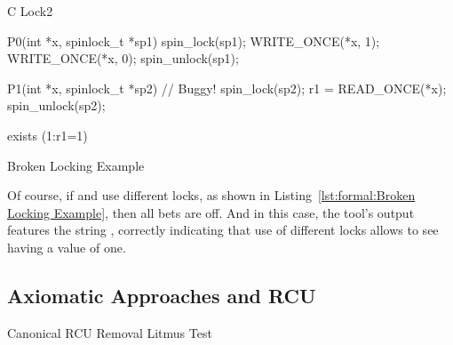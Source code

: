 \begin{listing}[tb]
\begin{linelabel}
\begin{VerbatimL}[commandchars=\\\[\]]
C Lock2

{
}

P0(int *x, spinlock_t *sp1)
{
	spin_lock(sp1);
	WRITE_ONCE(*x, 1);
	WRITE_ONCE(*x, 0);
	spin_unlock(sp1);
}

P1(int *x, spinlock_t *sp2) // Buggy!
{
	spin_lock(sp2);
	r1 = READ_ONCE(*x);
	spin_unlock(sp2);
}

exists (1:r1=1)
\end{VerbatimL}
\end{linelabel}
\caption{Broken Locking Example}
\label{lst:formal:Broken Locking Example}
\end{listing}

Of course, if  and  use different locks, as shown in
Listing~\ref{lst:formal:Broken Locking Example},
then all bets are off.
And in this case, the  tool's output features the string
, correctly indicating that use of different locks allows
 to see  having a value of one.

\subsection{Axiomatic Approaches and RCU}
\label{sec:formal:Axiomatic Approaches and RCU}

\begin{listing}[tb]

\caption{Canonical RCU Removal Litmus Test}
\label{lst:formal:Canonical RCU Removal Litmus Test}
\end{listing}

